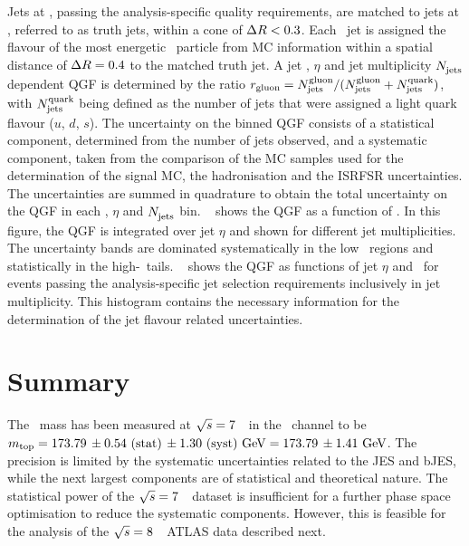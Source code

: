 Jets at \recolevel, passing the analysis-specific quality requirements, are matched to jets at \stablevel, referred to as truth jets, within a cone of $\Delta R<0.3$. 
%
Each \recolevel\ jet is assigned the flavour of the most energetic \genlevel\ particle from \gls{MC} information within a spatial distance of $\Delta R=0.4$ to the matched truth jet. 
%
A jet \pt, $\eta$ and jet multiplicity $N^{\mathrm{}}_{\mathrm{jets}}$ dependent \gls{QGF} is determined by the ratio $r_\mathrm{gluon}=N^{\mathrm{gluon}}_{\mathrm{jets}}/(N^{\mathrm{gluon}}_{\mathrm{jets}}+N^{\mathrm{quark}}_{\mathrm{jets}})$, with $N^{\mathrm{quark}}_{\mathrm{jets}}$ being defined as the number of jets that were assigned a light quark flavour ($u$, $d$, $s$).
%
The uncertainty on the binned \gls{QGF} consists of a statistical component, determined from the number of jets observed, and a systematic component, taken from the comparison of the \gls{MC} samples used for the determination of the signal \gls{MC}, the hadronisation and the \gls{ISRFSR} uncertainties. The uncertainties are summed in quadrature to obtain the total uncertainty on the \gls{QGF} in each \pt, $\eta$ and $N^{\mathrm{}}_{\mathrm{jets}}$ bin. 
%
\Fig~ shows the \gls{QGF} as a function of \pt. In this figure, the \gls{QGF} is integrated over jet $\eta$ and shown for different jet multiplicities. The uncertainty bands are dominated systematically in the low \pt\ regions and statistically in the high-\pt\ tails. 
%
\Fig~ shows the \gls{QGF} as functions of jet $\eta$ and \pt\ for events passing the analysis-specific jet selection requirements inclusively in jet multiplicity. This histogram contains the necessary information for the determination of the jet flavour related uncertainties. 
%







\section{Summary}
%
The \tquark\ mass has been measured at ${\sqrt{s}}=7$~\TeV\ in the \ttbarll\ channel to be $m_{\mathrm{top}} = 173.79\,\pm 0.54~\mathrm{(stat)}\,\pm 1.30~\mathrm{(syst)}~\mathrm{GeV}=173.79\,\pm 1.41~\mathrm{GeV}$.  
%
The precision is limited by the systematic uncertainties related to the \gls{JES} and \gls{bJES}, while the next largest components are of statistical and theoretical nature. 
%
The statistical power of the ${\sqrt{s}}=7$~\TeV\ dataset is insufficient for a further phase space optimisation to reduce the systematic components. 
%
However, this is feasible for the analysis of the ${\sqrt{s}}=8$~\TeV\ \gls{ATLAS} data described next.
